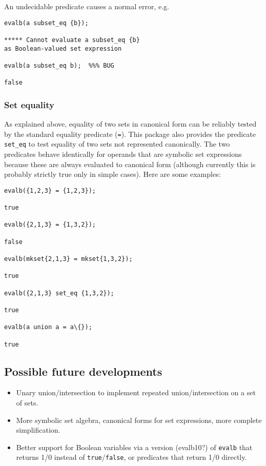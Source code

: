 An undecidable predicate causes a normal \REDUCE error, e.g.
\begin{verbatim}
evalb(a subset_eq {b});

***** Cannot evaluate a subset_eq {b}
as Boolean-valued set expression

evalb(a subset_eq b);  %%% BUG

false
\end{verbatim}


\subsubsection{Set equality}
\hypertarget{operator:SET_EQ}{}

As explained above, equality of two sets in canonical form can be
reliably tested by the standard \REDUCE equality predicate (\texttt{=}).
This package also provides the predicate \texttt{set\_eq} to test
equality of two sets not represented canonically.  The two predicates
behave identically for operands that are symbolic set expressions
because these are always evaluated to canonical form (although
currently this is probably strictly true only in simple cases).  Here
are some examples:
\begin{verbatim}
evalb({1,2,3} = {1,2,3});

true

evalb({2,1,3} = {1,3,2});

false

evalb(mkset{2,1,3} = mkset{1,3,2});

true

evalb({2,1,3} set_eq {1,3,2});

true

evalb(a union a = a\{});

true
\end{verbatim}


\subsection{Possible future developments}

\begin{itemize}
\item Unary union/intersection to implement repeated
  union/intersection on a set of sets.
\item More symbolic set algebra, canonical forms for set expressions,
  more complete simplification.
\item Better support for Boolean variables via a version (evalb10?)
  of \texttt{evalb} that returns 1/0 instead of \texttt{true}/\texttt{false},
  or predicates that return 1/0 directly.
\end{itemize}
